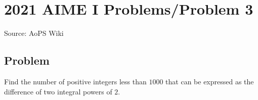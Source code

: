 \documentclass[12pt]{article}
\begin{document}
\section*{{2021 AIME I Problems/Problem 3}}
Source: AoPS Wiki

\subsection*{Problem}
Find the number of positive integers less than $1000$ that can be expressed as the difference of two integral powers of $2.$
\end{document}
